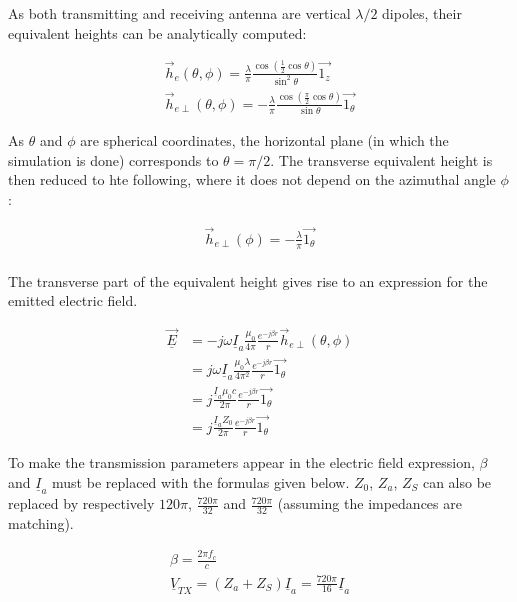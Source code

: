 \documentclass[10pt,a4paper]{ULBreport}
\begin{document}
As both transmitting and receiving antenna are vertical $\lambda/2$ dipoles, their equivalent heights can be analytically computed:

\begin{align*}
    \vec{h}_e (\theta, \phi) = \frac{\lambda}{\pi} \frac{\cos(\frac{1}{2}\cos \theta)}{\sin ^2 \theta}\vec{1_z}\\
    \vec{h}_{e\perp} (\theta, \phi) = -\frac{\lambda}{\pi} \frac{\cos(\frac{\pi}{2}\cos \theta)}{\sin \theta}\vec{1_\theta}
\end{align*}

As $\theta$ and $\phi$ are spherical coordinates, the horizontal plane (in which the simulation is done) corresponds to $\theta = \pi/2$. The transverse equivalent height is then reduced to hte following, where it does not depend on the azimuthal angle $\phi$:

\begin{align*}
    \vec{h}_{e\perp} (\phi) = -\frac{\lambda}{\pi} \vec{1_{\theta}}\\
\end{align*}

The transverse part of the equivalent height gives rise to an expression for the emitted electric field.

\begin{align*}
    \underline{\vec{E}} &= -j\omega \underline{I}_a \frac{\mu_0}{4\pi}\frac{e^{-j\beta r}}{r}\vec{h}_{e\perp}(\theta, \phi) \\
    &= j\omega \underline{I}_a \frac{\mu_0\lambda}{4\pi^2}\frac{e^{-j\beta r}}{r} \vec{1_{\theta}} \\
    &= j \frac{\underline{I}_a \mu_0 c}{2\pi} \frac{e^{-j\beta r}}{r} \vec{1_{\theta}}\\
    &= j \frac{\underline{I}_a Z_0}{2\pi} \frac{e^{-j\beta r}}{r} \vec{1_{\theta}}
\end{align*}

To make the transmission parameters appear in the electric field expression, $\beta$ and $\underline{I}_a$ must be replaced with the formulas given below. $Z_0$, $Z_a$, $Z_S$ can also be replaced by respectively $120\pi$, $\frac{720\pi}{32}$ and $\frac{720\pi}{32}$ (assuming the impedances are matching).

\begin{gather*}
    \beta = \frac{2\pi f_c}{c}\\
    \underline{V}_{TX} = (Z_a + Z_S) \underline{I}_a = \frac{720\pi}{16} \underline{I}_a
\end{gather*}
\end{document}
